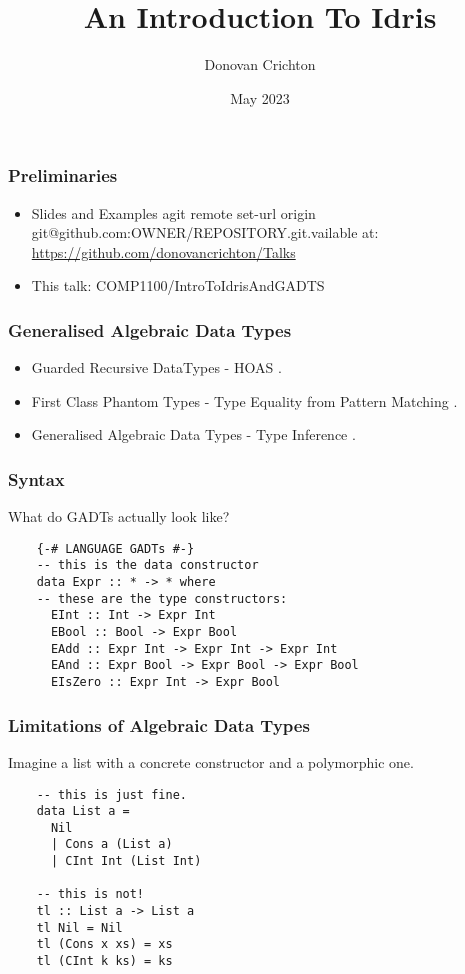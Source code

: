 \documentclass[hyperref={colorlinks = true,linkcolor = blue, citecolor = blue, urlcolor = blue}]{beamer}
\title{An Introduction To Idris}
\author{Donovan Crichton}
\date{May 2023}
\begin{document}
 
\frame{\titlepage}

\begin{frame}[fragile]
  \frametitle{Preliminaries}
  \begin{itemize}
  \item Slides and Examples agit remote set-url origin git@github.com:OWNER/REPOSITORY.git.vailable at:
    \url{https://github.com/donovancrichton/Talks}
  \item This talk: COMP1100/IntroToIdrisAndGADTS
  \end{itemize}
\end{frame}

\begin{frame}[fragile]
\frametitle{Generalised Algebraic Data Types}
\begin{itemize}
  \item Guarded Recursive DataTypes - HOAS \citep{xi2003guarded}.
  \item First Class Phantom Types - Type Equality from Pattern Matching \citep{cheney2003first}.
  \item Generalised Algebraic Data Types - Type Inference \citep{jones2004wobbly}.
\end{itemize}
\end{frame}

\begin{frame}[fragile]
  \frametitle{Syntax}
  What do GADTs actually look like?
  \begin{verbatim}
    {-# LANGUAGE GADTs #-}
    -- this is the data constructor
    data Expr :: * -> * where
    -- these are the type constructors:
      EInt :: Int -> Expr Int
      EBool :: Bool -> Expr Bool
      EAdd :: Expr Int -> Expr Int -> Expr Int
      EAnd :: Expr Bool -> Expr Bool -> Expr Bool
      EIsZero :: Expr Int -> Expr Bool
  \end{verbatim}
\end{frame}

\begin{frame}[fragile]
  \frametitle{Limitations of Algebraic Data Types}
  Imagine a list with a concrete constructor and a polymorphic one.
  \begin{verbatim}
    -- this is just fine.
    data List a =
      Nil
      | Cons a (List a)
      | CInt Int (List Int)

    -- this is not! 
    tl :: List a -> List a
    tl Nil = Nil
    tl (Cons x xs) = xs
    tl (CInt k ks) = ks
  \end{verbatim}
\end{frame}
\end{document}
